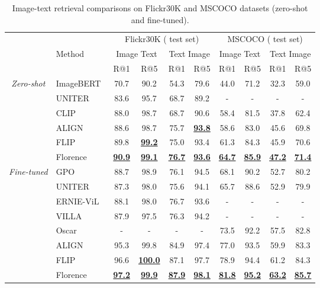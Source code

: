 \documentclass{article}
\begin{document}
\begin{table*}[t]
\centering
\setlength{\tabcolsep}{9.5pt}
\small
\renewcommand{\arraystretch}{1.35}
\begin{tabular}{cl|cccc|cccc}
\toprule
& & \multicolumn{4}{c|}{Flickr30K ( test set)} & \multicolumn{4}{c}{MSCOCO ( test set)} \\
& Method & \multicolumn{2}{c}{Image  Text} & \multicolumn{2}{c|}{Text  Image} &
\multicolumn{2}{c}{Image  Text} & \multicolumn{2}{c}{Text  Image} \\
& & R@1 & R@5  & R@1 & R@5  & R@1 & R@5  & R@1 & R@5 \\
\midrule
\multirow{5}{*}{\it{Zero-shot}} & ImageBERT~\cite{qi:imagebert} & 70.7 & 90.2 & 54.3 & 79.6 & 44.0 &
71.2 & 32.3 & 59.0  \\
& UNITER~\cite{chen:uniter} & 83.6 & 95.7 & 68.7 & 89.2 & - & - & - & - \\
& CLIP~\cite{radford2021learning} & 88.0 & 98.7 & 68.7 & 90.6 & 58.4 & 81.5 & 37.8 & 62.4 \\
& ALIGN~\cite{jia2021scaling} & 88.6 & 98.7  & 75.7 & \underline{\bf{93.8}}  & 58.6 & 83.0  & 45.6 &
69.8  \\
& FLIP~\cite{yao2021filip} & 89.8 & \underline{\bf{99.2}}  & 75.0 & 93.4  & 61.3 & 84.3  & 45.9 &
70.6  \\
& Florence & \underline{\bf{90.9}} & \underline{\bf{99.1}} &  \underline{\bf{76.7}} &
\underline{\bf{93.6}} & \underline{\bf{64.7}} & \underline{\bf{85.9}} & \underline{\bf{47.2}} &
\underline{\bf{71.4}} \\
\hline
\multirow{7}{*}{\it{Fine-tuned}} & GPO~\cite{chen:vsepooling} & 88.7 & 98.9  & 76.1 & 94.5& 68.1 &
90.2 & 52.7 & 80.2  \\
& UNITER~\cite{chen:uniter} & 87.3 & 98.0 & 75.6 & 94.1 & 65.7 & 88.6 &  52.9 & 79.9  \\
& ERNIE-ViL~\cite{yu:ernie-vil} & 88.1 & 98.0 & 76.7 & 93.6   & - & - & - & - \\
& VILLA~\cite{gan:villa} & 87.9 & 97.5 & 76.3 & 94.2 & - & - & - & - \\
& Oscar~\cite{li:oscar} & - & - & - & - & 73.5 & 92.2 & 57.5 & 82.8 \\
& ALIGN~\cite{jia2021scaling} & {95.3} & {99.8} & {84.9} & {97.4} & {77.0} & {93.5} & {59.9} &
{83.3} \\
& FLIP~\cite{yao2021filip} & 96.6 & \underline{\bf{100.0}}  & 87.1 & 97.7  & 78.9 & 94.4  & 61.2 &
84.3  \\
& Florence & \underline{\bf{97.2}} & \underline{\bf{99.9}} & \underline{\bf{87.9}} &
\underline{\bf{98.1}} & \underline{\bf{81.8}} & \underline{\bf{95.2}}& \underline{\bf{63.2}} &
\underline{\bf{85.7}} \\
\bottomrule
\end{tabular}
\caption{Image-text retrieval comparisons on Flickr30K and MSCOCO datasets (zero-shot and
fine-tuned).}
\label{tab:flickr30k_mscoco_result}
\end{table*}
\end{document}
